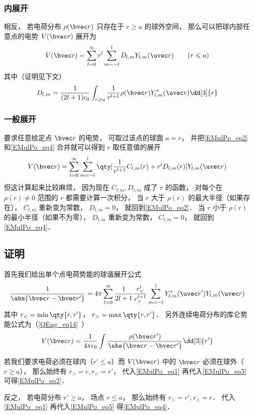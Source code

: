 \subsubsection{内展开}
相反， 若电荷分布 $\rho(\bvec r)$ 只存在于 $r \geqslant a$ 的球外空间， 那么可以把球内部任意点的电势 $V(\bvec r)$ 展开为
\begin{equation}\label{EMulPo_eq4}
V(\bvec r) = \sum_{l = 0}^\infty r^l \sum_{m = -l}^l D_{l,m} Y_{l,m}(\uvec r) \qquad (r \leqslant a)
\end{equation}
其中（证明见下文）
\begin{equation}\label{EMulPo_eq3}
D_{l,m} = \frac{1}{(2l+1)\epsilon_0} \int_{r\geqslant a} \frac{1}{r^{l+1}} \rho(\bvec r) Y_{l,m}^*(\uvec r) \dd[3]{r}
\end{equation}

\subsubsection{一般展开}
要求任意给定点 $\bvec r$ 的电势， 可取过该点的球面 $a = r$， 并把\autoref{EMulPo_eq2} 和\autoref{EMulPo_eq4} 合并就可以得到 $r$ 取任意值的展开
\begin{equation}
V(\bvec r) = \sum_{l = 0}^\infty\sum_{m = -l}^l \qty[\frac{1}{r^{l+1}} C_{l,m}(r) + r^l D_{l,m}(r)] Y_{l,m}(\uvec r)
\end{equation}
但这计算起来比较麻烦， 因为现在 $C_{l,m}, D_{l,m}$ 成了 $r$ 的函数， 对每个在 $\rho(r)\ne 0$ 范围的 $r$ 都需要计算一次积分， 当 $r$ 大于 $\rho(r)$ 的最大半径（如果存在）， $C_{l,m}$ 重新变为常数， $D_{l,m}= 0$， 就回到\autoref{EMulPo_eq2}． 当 $r$ 小于 $\rho(r)$ 的最小半径（如果不为零）， $D_{l,m}$ 重新变为常数， $C_{l,m} = 0$， 就回到\autoref{EMulPo_eq4}．

\subsection{证明}
首先我们给出单个点电荷势能的球谐展开公式
\begin{equation}\label{EMulPo_eq1}
\frac{1}{\abs{\bvec r - \bvec r'}} = 4\pi \sum_{l=0}^{\infty} \frac{1}{2l+1} \frac{r_<^l}{r_>^{l+1}} \sum_{m = -l}^l Y_{l,m}^*(\uvec r') Y_{l,m}(\uvec r)
\end{equation}
其中 $r_< = \min\qty{r, r'}$， $r_> = \max\qty{r, r'}$． 另外连续电荷分布的库仑势能公式为（\autoref{QEng_eq14}~）
\begin{equation}\label{EMulPo_eq5}
V(\bvec r) = \frac{1}{4\pi\epsilon_0}\int \frac{\rho(\bvec r')}{\abs{\bvec r - \bvec r'}} \dd[3]{r'}
\end{equation}

若我们要求电荷必须在球内（$r' \leqslant a$）而 $V(\bvec r)$ 中的 $\bvec r$ 必须在球外（$r \geqslant a$）， 那么始终有 $r_> = r, r_< = r'$， 代入\autoref{EMulPo_eq1} 再代入\autoref{EMulPo_eq5} 可得\autoref{EMulPo_eq2}．

反之， 若电荷分布 $r' \geqslant a$， 场点 $r \leqslant a$， 那么始终有 $r_> = r', r_< = r$． 代入\autoref{EMulPo_eq1} 再代入\autoref{EMulPo_eq5} 得\autoref{EMulPo_eq4}．
